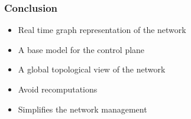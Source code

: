 

%
%
\begin{frame}\frametitle{Conclusion}

    \begin{itemize}
        \item Real time graph representation of the network
        \item A base model for the control plane
        \item A global topological view of the network
        \item Avoid recomputations
        \item Simplifies the network management
    \end{itemize}

\end{frame}
